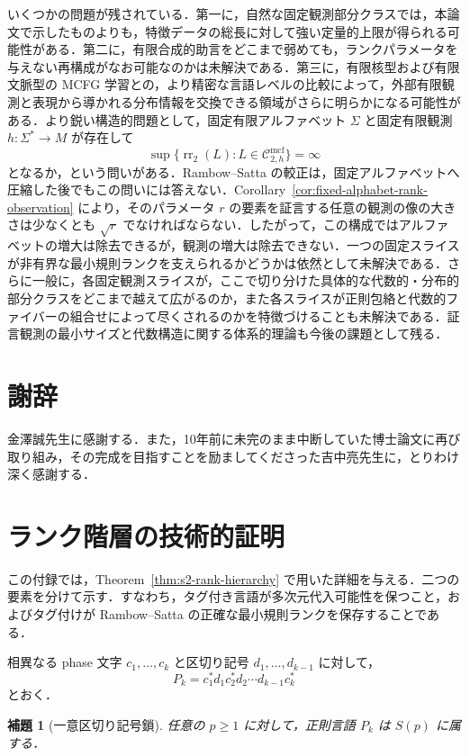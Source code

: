 \documentclass[11pt,a4paper]{ltjsarticle}
\numberwithin{equation}{section}
\theoremstyle{plain}
\newtheorem{lemma}[theorem]{補題}
\theoremstyle{definition}
\theoremstyle{remark}
\newcommand{\Cmcf}[2]{\mathcal{C}^{\mathrm{mcf}}_{#1,#2}}
\begin{document}
いくつかの問題が残されている．第一に，自然な固定観測部分クラスでは，本論文で示したものよりも，特徴データの総長に対して強い定量的上限が得られる可能性がある．第二に，有限合成的助言をどこまで弱めても，ランクパラメータを与えない再構成がなお可能なのかは未解決である．第三に，有限核型および有限文脈型の MCFG 学習との，より精密な言語レベルの比較によって，外部有限観測と表現から導かれる分布情報を交換できる領域がさらに明らかになる可能性がある．より鋭い構造的問題として，固定有限アルファベット $\Sigma$ と固定有限観測 $h:\Sigma^*\to M$ が存在して
\[
  \sup\{\operatorname{rr}_2(L):L\in\Cmcf{2}{h}\}=\infty
\]
となるか，という問いがある．Rambow--Satta の較正は，固定アルファベットへ圧縮した後でもこの問いには答えない．Corollary~\ref{cor:fixed-alphabet-rank-observation} により，そのパラメータ $r$ の要素を証言する任意の観測の像の大きさは少なくとも $\sqrt r$ でなければならない．したがって，この構成ではアルファベットの増大は除去できるが，観測の増大は除去できない．一つの固定スライスが非有界な最小規則ランクを支えられるかどうかは依然として未解決である．さらに一般に，各固定観測スライスが，ここで切り分けた具体的な代数的・分布的部分クラスをどこまで越えて広がるのか，また各スライスが正則包絡と代数的ファイバーの組合せによって尽くされるのかを特徴づけることも未解決である．証言観測の最小サイズと代数構造に関する体系的理論も今後の課題として残る．

\section*{謝辞}
金澤誠先生に感謝する．また，10年前に未完のまま中断していた博士論文に再び取り組み，その完成を目指すことを励ましてくださった吉中亮先生に，とりわけ深く感謝する．

\appendix
\section{ランク階層の技術的証明}
\label{app:rank-hierarchy}

この付録では，Theorem~\ref{thm:s2-rank-hierarchy} で用いた詳細を与える．二つの要素を分けて示す．すなわち，タグ付き言語が多次元代入可能性を保つこと，およびタグ付けが Rambow--Satta の正確な最小規則ランクを保存することである．

相異なる phase 文字 $c_1,\ldots,c_k$ と区切り記号
$d_1,\ldots,d_{k-1}$ に対して，
\[
  P_k=c_1^*d_1c_2^*d_2\cdots d_{k-1}c_k^*
\]
とおく．

\begin{lemma}[一意区切り記号鎖]
\label{lem:unique-delimiter-chain}
任意の $p\ge1$ に対して，正則言語 $P_k$ は $S(p)$ に属する．
\end{lemma}
\end{document}

